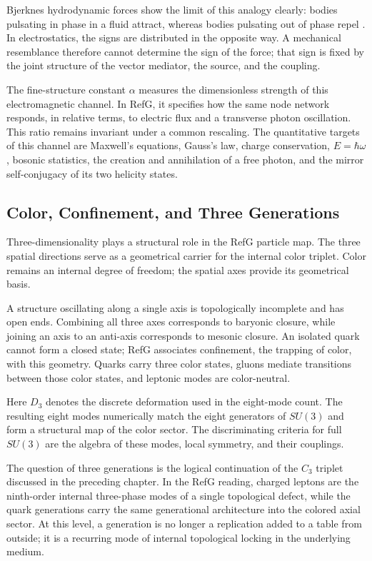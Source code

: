 \documentclass[11pt,a4paper]{article}
\begin{document}
Bjerknes hydrodynamic forces show the limit of this analogy clearly: bodies pulsating in phase in a fluid attract, whereas bodies pulsating out of phase repel \citep{bjerknes1906}. In electrostatics, the signs are distributed in the opposite way. A mechanical resemblance therefore cannot determine the sign of the force; that sign is fixed by the joint structure of the vector mediator, the source, and the coupling.

The fine-structure constant $\alpha$ measures the dimensionless strength of this electromagnetic channel. In RefG, it specifies how the same node network responds, in relative terms, to electric flux and a transverse photon oscillation. This ratio remains invariant under a common rescaling. The quantitative targets of this channel are Maxwell's equations, Gauss's law, charge conservation, $E=\hbar\omega$, bosonic statistics, the creation and annihilation of a free photon, and the mirror self-conjugacy of its two helicity states.

\subsection{Color, Confinement, and Three Generations}

Three-dimensionality plays a structural role in the RefG particle map. The three spatial directions serve as a geometrical carrier for the internal color triplet. Color remains an internal degree of freedom; the spatial axes provide its geometrical basis.

A structure oscillating along a single axis is topologically incomplete and has open ends. Combining all three axes corresponds to baryonic closure, while joining an axis to an anti-axis corresponds to mesonic closure. An isolated quark cannot form a closed state; RefG associates confinement, the trapping of color, with this geometry. Quarks carry three color states, gluons mediate transitions between those color states, and leptonic modes are color-neutral.

Here $D_3$ denotes the discrete deformation used in the eight-mode count. The resulting eight modes numerically match the eight generators of $SU(3)$ and form a structural map of the color sector. The discriminating criteria for full $SU(3)$ are the algebra of these modes, local symmetry, and their couplings.

The question of three generations is the logical continuation of the $C_3$ triplet discussed in the preceding chapter. In the RefG reading, charged leptons are the ninth-order internal three-phase modes of a single topological defect, while the quark generations carry the same generational architecture into the colored axial sector. At this level, a generation is no longer a replication added to a table from outside; it is a recurring mode of internal topological locking in the underlying medium.
\end{document}
